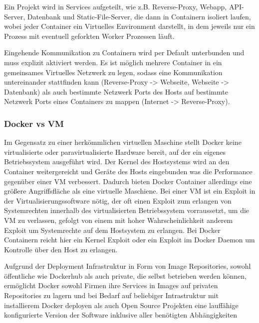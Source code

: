 Ein Projekt wird in Services aufgeteilt, wie z.B. Reverse-Proxy, Webapp,
API-Server, Datenbank und Static-File-Server, die dann in Containern isoliert
laufen, wobei jeder Container ein Virtuelles Environment darstellt, in dem 
jeweils nur ein Prozess mit eventuell geforkten Worker Prozessen läuft.

\begin{figure}
  \centering
  \def\svgwidth{\columnwidth / 2}
  
\end{figure}

Eingehende Kommunikation zu Containern wird per Default unterbunden und muss
explizit aktiviert werden. Es ist möglich mehrere Container in ein
gemeinsames Virtuelles Netzwerk zu legen, sodass eine Kommunikation
untereinander stattfinden kann (Reverse-Proxy -> Webseite, Webseite ->
Datenbank) als auch bestimmte Netzwerk Ports des Hosts auf bestimmte Netzwerk
Ports eines Containers zu mappen (Internet -> Reverse-Proxy).

\begin{figure}
  \centering
  \def\svgwidth{\columnwidth}
  
\end{figure}

\subsubsection{Docker vs VM}

Im Gegensatz zu einer herkömmlichen virtuellen Maschine stellt Docker keine
virtualisierte oder paravirtualisierte Hardware bereit, auf der ein eigenes
Betriebssystem ausgeführt wird. Der Kernel des Hostsystems wird an den Container
weitergereicht und Geräte des Hosts eingebunden was die Performance gegenüber
einer VM verbessert. Dadurch bieten Docker Container allerdings eine größere
Angriffsfläche als eine virtuelle Maschiene. Bei einer VM ist ein Exploit in der
Virtualisierungssoftware nötig, der oft einen Exploit zum erlangen von
Systemrechten innerhalb des virtualisierten Betriebssystem vorraussetzt, um die
VM zu verlassen, gefolgt von einem mit hoher Wahrscheinlichkeit anderem Exploit
um Systemrechte auf dem Hostsystem zu erlangen. Bei Docker Containern reicht
hier ein Kernel Exploit oder ein Exploit im Docker Daemon um Kontrolle über den
Host zu erlangen.

Aufgrund der Deployment Infrastruktur in Form von Image Repositories, sowohl
öffentliche wie Dockerhub als auch private, die selbst betrieben werden können,
ermöglicht Docker sowohl Firmen ihre Services in Images auf privaten
Repositories zu lagern und bei Bedarf auf beliebiger Intrastruktur mit
installierem Docker deployen als auch Open Source Projekten eine lauffähige
konfigurierte Version der Software inklusive aller benötigten Abhängigkeiten 

